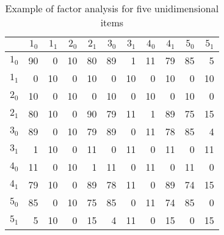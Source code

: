 \begin{table}[ht]
\centering
\begin{tabular}{rrrrrrrrrrr}
  \toprule
 & $1_0$ & $1_1$ & $2_0$ & $2_1$ & $3_0$ & $3_1$ & $4_0$ & $4_1$ & $5_0$ & $5_1$ \\ 
  \midrule
$1_0$ &  90 &   0 &  10 &  80 &  89 &   1 &  11 &  79 &  85 &   5 \\ 
  $1_1$ &   0 &  10 &   0 &  10 &   0 &  10 &   0 &  10 &   0 &  10 \\ 
  $2_0$ &  10 &   0 &  10 &   0 &  10 &   0 &  10 &   0 &  10 &   0 \\ 
  $2_1$ &  80 &  10 &   0 &  90 &  79 &  11 &   1 &  89 &  75 &  15 \\ 
  $3_0$ &  89 &   0 &  10 &  79 &  89 &   0 &  11 &  78 &  85 &   4 \\ 
  $3_1$ &   1 &  10 &   0 &  11 &   0 &  11 &   0 &  11 &   0 &  11 \\ 
  $4_0$ &  11 &   0 &  10 &   1 &  11 &   0 &  11 &   0 &  11 &   0 \\ 
  $4_1$ &  79 &  10 &   0 &  89 &  78 &  11 &   0 &  89 &  74 &  15 \\ 
  $5_0$ &  85 &   0 &  10 &  75 &  85 &   0 &  11 &  74 &  85 &   0 \\ 
  $5_1$ &   5 &  10 &   0 &  15 &   4 &  11 &   0 &  15 &   0 &  15 \\ 
   \bottomrule
\end{tabular}
\caption{Example of factor analysis for five unidimensional items} 
\label{tab:fa1}
\end{table}
